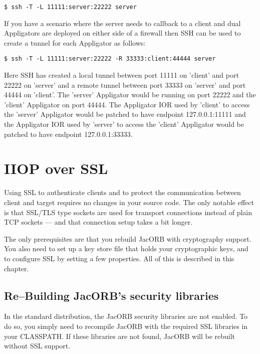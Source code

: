 \documentclass[12pt]{scrbook}
\begin{document}
\verb+$ ssh -T -L 11111:server:22222 server+

If you have a scenario where the server needs to callback to a client
and dual Appligators are deployed on either side of a firewall then
SSH can be used to create a tunnel for each Appligator as follows:

\verb+$ ssh -T -L 11111:server:22222 -R 33333:client:44444 server+

Here SSH has created a local tunnel between port 11111 on 'client' and
port 22222 on 'server' and a remote tunnel between port 33333 on
'server' and port 44444 on 'client'. The 'server' Appligator would be
running on port 22222 and the 'client' Appligator on port 44444. The
Appligator IOR used by 'client' to access the 'server' Appligator
would be patched to have endpoint 127.0.0.1:11111 and the Appligator
IOR used by 'server' to access the 'client' Appligator would be
patched to have endpoint 127.0.0.1:33333.




\chapter{IIOP over SSL}

\label{SSL}

Using  SSL to authenticate  clients and  to protect  the communication
between client and target requires no changes in your source code. The
only  notable  effect  is  that  SSL/TLS type  sockets  are  used  for
transport  connections  instead of  plain  TCP  sockets  --- and  that
connection setup takes a bit longer.

The only  prerequisites are that you rebuild  JacORB with cryptography
support. You  also need  to set up  a key  store file that  holds your
cryptographic   keys,  and  to   configure  SSL   by  setting   a  few
properties. All of this is described in this chapter.

\section{Re--Building JacORB's security libraries}

In the  standard distribution, the  JacORB security libraries  are not
enabled.   To do  so, you  simply need  to recompile  JacORB  with the
required SSL libraries  in your CLASSPATH.  If these libraries
are not found, JacORB will be rebuilt without SSL support.
\end{document}
